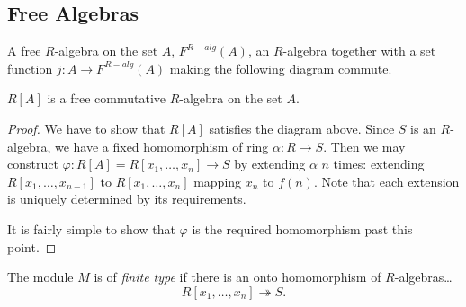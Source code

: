 \subsection{Free Algebras}\label{freealgebras}
A free $R$-algebra on the set $A$, $F^{R-alg}(A)$, an $R$-algebra together with a set
function $j : A \rightarrow F^{R-alg}(A)$ making the following diagram commute.
\begin{figure}[H]
\centering

\end{figure}

\begin{proposition}
$R[A]$ is a free commutative $R$-algebra on the set $A$.
\end{proposition}

\begin{proof}
We have to show that $R[A]$ satisfies the diagram above. Since $S$ is an $R$-algebra, we have a fixed homomorphism
of ring $\alpha : R \rightarrow S$. Then we may construct $\varphi : R[A] = R[x_1,\dots,x_n] \rightarrow S$ by extending
$\alpha$ $n$ times: extending $R[x_1,\dots,x_{n-1}]$ to $R[x_1,\dots,x_n]$ mapping $x_n$ to $f(n)$. Note that each extension
is uniquely determined by its requirements.

It is fairly simple to show that $\varphi$ is the required homomorphism past this point.
\end{proof}

\label{finitetype}
The module $M$ is of \emph{finite type} if there is an onto homomorphism of $R$-algebras\dots
$$R[x_1,\dots,x_n] \twoheadrightarrow S.$$

